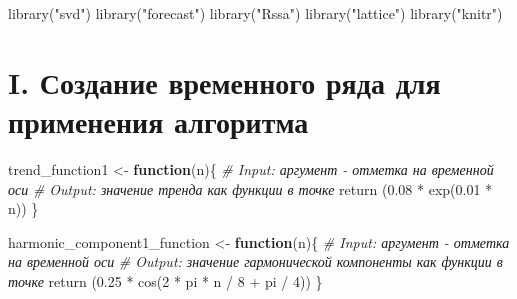 \documentclass[
]{article}
\author{}
\date{\vspace{-2.5em}}
\newenvironment{Shaded}{\begin{snugshade}}{\end{snugshade}}
\newcommand{\CommentTok}[1]{\textcolor[rgb]{0.56,0.35,0.01}{\textit{#1}}}
\newcommand{\ControlFlowTok}[1]{\textcolor[rgb]{0.13,0.29,0.53}{\textbf{#1}}}
\newcommand{\DecValTok}[1]{\textcolor[rgb]{0.00,0.00,0.81}{#1}}
\newcommand{\FloatTok}[1]{\textcolor[rgb]{0.00,0.00,0.81}{#1}}
\newcommand{\FunctionTok}[1]{\textcolor[rgb]{0.00,0.00,0.00}{#1}}
\newcommand{\NormalTok}[1]{#1}
\newcommand{\OtherTok}[1]{\textcolor[rgb]{0.56,0.35,0.01}{#1}}
\newcommand{\SpecialCharTok}[1]{\textcolor[rgb]{0.00,0.00,0.00}{#1}}
\newcommand{\StringTok}[1]{\textcolor[rgb]{0.31,0.60,0.02}{#1}}
\begin{document}
\begin{Shaded}
\begin{Highlighting}[]
  \FunctionTok{library}\NormalTok{(}\StringTok{"svd"}\NormalTok{)}
  \FunctionTok{library}\NormalTok{(}\StringTok{"forecast"}\NormalTok{)}
  \FunctionTok{library}\NormalTok{(}\StringTok{"Rssa"}\NormalTok{)}
  \FunctionTok{library}\NormalTok{(}\StringTok{"lattice"}\NormalTok{)}
  \FunctionTok{library}\NormalTok{(}\StringTok{"knitr"}\NormalTok{)}
\end{Highlighting}
\end{Shaded}

\hypertarget{i.-ux441ux43eux437ux434ux430ux43dux438ux435-ux432ux440ux435ux43cux435ux43dux43dux43eux433ux43e-ux440ux44fux434ux430-ux434ux43bux44f-ux43fux440ux438ux43cux435ux43dux435ux43dux438ux44f-ux430ux43bux433ux43eux440ux438ux442ux43cux430}{%
\section{I. Создание временного ряда для применения
алгоритма}\label{i.-ux441ux43eux437ux434ux430ux43dux438ux435-ux432ux440ux435ux43cux435ux43dux43dux43eux433ux43e-ux440ux44fux434ux430-ux434ux43bux44f-ux43fux440ux438ux43cux435ux43dux435ux43dux438ux44f-ux430ux43bux433ux43eux440ux438ux442ux43cux430}}

\begin{Shaded}
\begin{Highlighting}[]
\NormalTok{  trend\_function1 }\OtherTok{\textless{}{-}} \ControlFlowTok{function}\NormalTok{(n)\{}
    \CommentTok{\# Input: аргумент {-} отметка на временной оси}
    \CommentTok{\# Output: значение тренда как функции в точке}
    \FunctionTok{return}\NormalTok{ (}\FloatTok{0.08} \SpecialCharTok{*} \FunctionTok{exp}\NormalTok{(}\FloatTok{0.01} \SpecialCharTok{*}\NormalTok{ n))}
\NormalTok{  \}}
\end{Highlighting}
\end{Shaded}

\begin{Shaded}
\begin{Highlighting}[]
\NormalTok{  harmonic\_component1\_function }\OtherTok{\textless{}{-}} \ControlFlowTok{function}\NormalTok{(n)\{}
    \CommentTok{\# Input: аргумент {-} отметка на временной оси}
    \CommentTok{\# Output: значение гармонической компоненты как функции в точке}
    \FunctionTok{return}\NormalTok{ (}\FloatTok{0.25} \SpecialCharTok{*} \FunctionTok{cos}\NormalTok{(}\DecValTok{2} \SpecialCharTok{*}\NormalTok{ pi }\SpecialCharTok{*}\NormalTok{ n }\SpecialCharTok{/} \DecValTok{8} \SpecialCharTok{+}\NormalTok{ pi }\SpecialCharTok{/} \DecValTok{4}\NormalTok{)) }
\NormalTok{  \}}
\end{Highlighting}
\end{Shaded}
\end{document}
